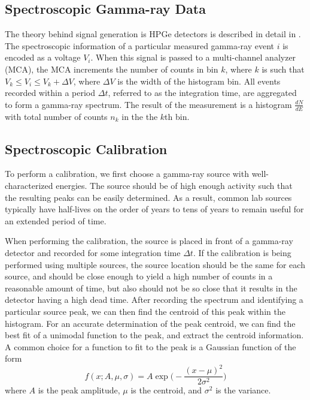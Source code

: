 \subsection{Spectroscopic Gamma-ray Data}
The theory behind signal generation is HPGe detectors is described in detail in \cite{gilmore_2011}.
The spectroscopic information of a particular measured gamma-ray event $i$ is encoded as a voltage $V_i$.
When this signal is passed to a multi-channel analyzer (MCA), the MCA increments the number of counts in bin $k$, where $k$ is such that $V_k \le V_i \le V_k + \Delta V$, where $\Delta V$ is the width of the histogram bin.
All events recorded within a period $\Delta t$, referred to as the integration time, are aggregated to form a gamma-ray spectrum.
The result of the measurement is a histogram $\frac{dN}{dE}$ with total number of counts $n_k$ in the the $k$th bin.

\subsection{Spectroscopic Calibration}
To perform a calibration, we first choose a gamma-ray source with well-characterized energies.
The source should be of high enough activity such that the resulting peaks can be easily determined.
As a result, common lab sources typically have half-lives on the order of years to tens of years to remain useful for an extended period of time.

When performing the calibration, the source is placed in front of a gamma-ray detector and recorded for some integration time $\Delta t$.
If the calibration is being performed using multiple sources, the source location should be the same for each source, and should be close enough to yield a high number of counts in a reasonable amount of time, but also should not be so close that it results in the detector having a high dead time.
After recording the spectrum and identifying a particular source peak, we can then find the centroid of this peak within the histogram.
For an accurate determination of the peak centroid, we can find the best fit of a unimodal function to the peak, and extract the centroid information.
A common choice for a function to fit to the peak is a Gaussian function of the form
\begin{equation}
f(x; A, \mu, \sigma) = A\exp\bigg(-\frac{(x-\mu)^2}{2\sigma^2}\bigg)
\end{equation}
where $A$ is the peak amplitude, $\mu$ is the centroid, and $\sigma^2$ is the variance.

